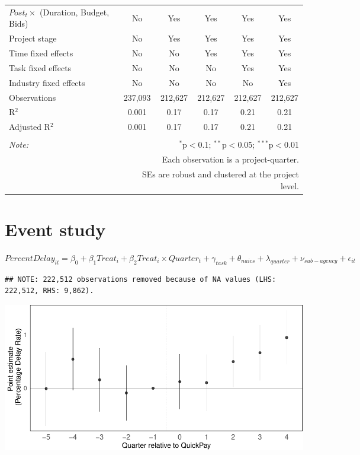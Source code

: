 \documentclass[
]{article}
\begin{document}
\begin{table}[H]
\begin{tabular}{@{\extracolsep{-2pt}}lccccc}
$Post_t \times$  (Duration, Budget, Bids) & No & Yes & Yes & Yes & Yes \\ 
Project stage & No & Yes & Yes & Yes & Yes \\ 
Time fixed effects & No & No & Yes & Yes & Yes \\ 
Task fixed effects & No & No & No & Yes & Yes \\ 
Industry fixed effects & No & No & No & No & Yes \\ 
Observations & 237,093 & 212,627 & 212,627 & 212,627 & 212,627 \\ 
R$^{2}$ & 0.001 & 0.17 & 0.17 & 0.21 & 0.21 \\ 
Adjusted R$^{2}$ & 0.001 & 0.17 & 0.17 & 0.21 & 0.21 \\ 
\hline 
\hline \\[-1.8ex] 
\textit{Note:}  & \multicolumn{5}{r}{$^{*}$p$<$0.1; $^{**}$p$<$0.05; $^{***}$p$<$0.01} \\ 
 & \multicolumn{5}{r}{Each observation is a project-quarter.} \\ 
 & \multicolumn{5}{r}{SEs are robust and clustered at the project level.} \\ 
\end{tabular} 
\end{table}

\hypertarget{event-study}{%
\section{Event study}\label{event-study}}

\(PercentDelay_{it}=\beta_0 + \beta_1 Treat_i + \beta_2 Treat_i \times Quarter_t + \gamma_{task} + \theta_{naics}+\lambda_{quarter}+\nu_{sub-agency}+\epsilon_{it}\)

\begin{verbatim}
## NOTE: 222,512 observations removed because of NA values (LHS: 222,512, RHS: 9,862).
\end{verbatim}

\includegraphics{qp_first_pc_delay_clean_control_files/figure-latex/event_study-1.pdf}
\end{document}
